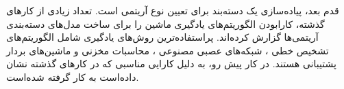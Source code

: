 قدم بعد، پیاده‌سازی یک دسته‌بند برای تعیین نوع آریتمی است. تعداد زیادی از کارهای گذشته، کارابودن الگوریتم‌های یادگیری ماشین را برای ساخت مدل‌های دسته‌بندی آریتمی‌ها گزارش کرده‌اند. پراستفاده‌ترین روش‌های یادگیری شامل الگوریتم‌های تشخیص خطی  \cite{deChazal2004, Llamedo2011}، شبکه‌های عصبی مصنوعی  \cite{Mar2011, Kumar2013}، محاسبات مخزنی  \cite{Escalona-Moran2015} و ماشین‌های بردار پشتیبانی  \cite{Zhang2005, Bazi2013} هستند. در کار پیش رو،  به دلیل کارایی مناسبی که در کارهای گذشته نشان داده‌است به کار گرفته شده‌است. \cite{Mondejar}


